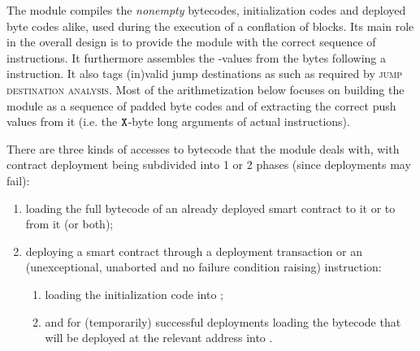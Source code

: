 The \romMod{} module compiles the \emph{nonempty} bytecodes, initialization codes and deployed byte codes alike, used during the execution of a conflation of blocks.
Its main role in the overall design is to provide the \hubMod{} module with the correct sequence of instructions.
It furthermore assembles the -values from the bytes following a  instruction.
It also tags (in)valid jump destinations as such as required by \textsc{jump destination analysis}.
Most of the arithmetization below focuses on building the \romMod{} module  as a sequence of padded byte codes and of extracting the correct push values from it (i.e. the $\texttt{X}$-byte long arguments of actual  instructions).

There are three kinds of accesses to bytecode that the \romMod{} module  deals with, with contract deployment being subdivided into 1 or 2 phases (since deployments may fail):
\begin{enumerate}
    \item loading the full bytecode of an already deployed smart contract to  it or to  from it (or both);
    \item deploying a smart contract through a deployment transaction or an (unexceptional, unaborted and no failure condition raising)  instruction:
        \begin{enumerate}
            \item loading the initialization code into \romMod{};
            \item and for (temporarily) successful deployments loading the bytecode that will be deployed at the relevant address into \romMod{}.
        \end{enumerate}
\end{enumerate}
